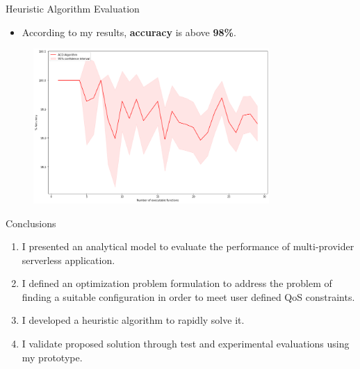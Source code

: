 \documentclass[13.5pt]{beamer}
\newcommand{\B}[1]{\textcolor{TorVergataColor}{\textbf{#1}}}
\begin{document}

\begin{frame}{Heuristic Algorithm Evaluation}
	
	\begin{itemize}
		\item According to my results, \B{accuracy} is above \B{98\%}.
	\end{itemize}
	
	\begin{figure}[h]
		\centering
		\includegraphics[width=0.8\textwidth,height=0.55\columnwidth]{../Images/ACOvsOptimalAccuracyIncreasingExecutable.png}
	\end{figure}
	
\end{frame}



\begin{frame}{Conclusions}

\begin{enumerate}
	
	\item I presented an analytical model to evaluate the performance of multi-provider serverless application.
	\vspace{\baselineskip}
	\item I defined an optimization problem formulation to address the problem of finding a suitable configuration in order to meet user defined QoS constraints.
	\vspace{\baselineskip}
	\item I developed a heuristic algorithm to rapidly solve it.
	\vspace{\baselineskip}
	\item I validate proposed solution through test and experimental evaluations using my prototype.	
\end{enumerate}
\end{frame}
\end{document}
